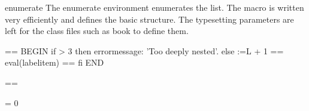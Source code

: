  \begin{macro}{\c@enumi}
 \begin{macro}{\c@enumii}
 \begin{macro}{\c@enumii}
 \begin{macro}{\c@enumiv}
    \begin{teX}
    \end{teX}
 \end{macro}
 \end{macro}
 \end{macro}
 \end{macro}

 \begin{environment}{enumerate}
  The enumerate environment enumerates the list. The macro
  is written very efficiently and defines the basic structure. The
  typesetting parameters are left for the class files such as book
  to define them.
     \begin{teX}
\def\enumerate{%
  \ifnum \@enumdepth >\thr@@\@toodeep\else
    \advance\@enumdepth\@ne
    \edef\@enumctr{enum\romannumeral\the\@enumdepth}%
      \expandafter
      \list
        \csname label\@enumctr\endcsname
        {\usecounter\@enumctr\def\makelabel##1{\hss\llap{##1}}}%
  \fi}
    \end{teX}

    \begin{teX}
\let\endenumerate =\endlist
    \end{teX}
 \end{environment}


 \begin{teX}
  \itemize ==
    BEGIN
      if \@itemdepth > 3
        then  errormessage: 'Too deeply nested'.
        else \@itemdepth :=L \@itemdepth + 1
             \@itemitem  == eval(labelitem\romannumeral\the\@itemdepth)
             \list{\@nameuse{\@itemitem}}
                   { ==  \hss {}}
      fi
    END

  \enditemize ==  \endlist

 \end{teX}

 \begin{macro}{\@itemdepth}
    \begin{teX}
\newcount\@itemdepth \@itemdepth = 0
    \end{teX}
 \end{macro}

